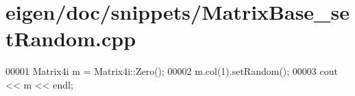 \hypertarget{eigen_2doc_2snippets_2_matrix_base__set_random_8cpp_source}{}\section{eigen/doc/snippets/\+Matrix\+Base\+\_\+set\+Random.cpp}
\label{eigen_2doc_2snippets_2_matrix_base__set_random_8cpp_source}

\begin{DoxyCode}
00001 Matrix4i m = Matrix4i::Zero();
00002 m.col(1).setRandom();
00003 cout << m << endl;
\end{DoxyCode}
